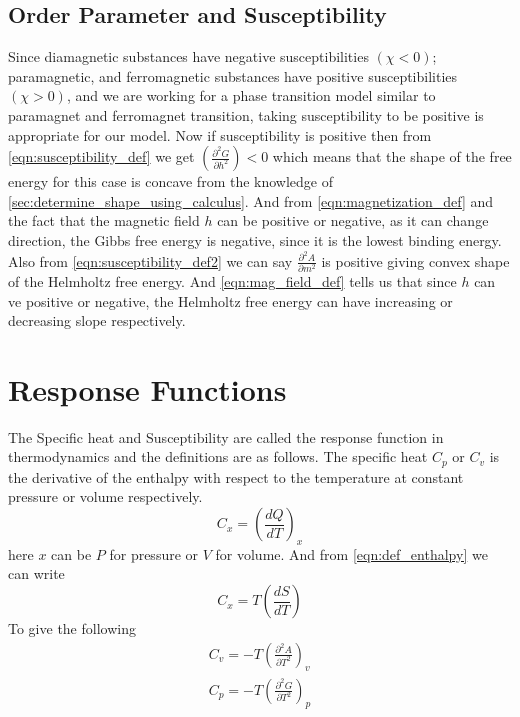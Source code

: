 	\subsection{Order Parameter and Susceptibility}
	Since diamagnetic substances have negative susceptibilities $(\chi < 0)$; paramagnetic, and ferromagnetic substances have positive susceptibilities $(\chi > 0)$, and we are working for a phase transition model similar to paramagnet and ferromagnet transition, taking susceptibility to be positive is appropriate for our model. Now if susceptibility is positive then from \ref{eqn:susceptibility_def} we get $\left(\frac{\partial^2G}{\partial h ^2}\right) < 0$ which means that the shape of the free energy for this case is concave from the knowledge of \ref{sec:determine_shape_using_calculus}. And from \ref{eqn:magnetization_def} and the fact that the magnetic field $h$ can be positive or negative, as it can change direction, the Gibbs free energy is negative, since it is the lowest binding energy. \\
	Also from \ref{eqn:susceptibility_def2} we can say $\frac{\partial^2 A}{\partial m ^2}$ is positive giving convex shape of the Helmholtz free energy. And \ref{eqn:mag_field_def} tells us that since $h$ can ve positive or negative, the Helmholtz free energy can have increasing or decreasing slope respectively.
	


\section{Response Functions}
	\label{sect:response-functions}
	The Specific heat and Susceptibility are called the response function in thermodynamics and the definitions are as follows. The specific heat $C_p$ or $C_v$ is the derivative of the enthalpy with respect to the temperature at constant pressure or volume respectively.
	\begin{equation}
	C_x = \left(\frac{dQ}{dT}\right)_x
	\label{eqn:def_specific_heat}
	\end{equation}
	here $x$ can be $P$ for pressure or $V$ for volume. And from \ref{eqn:def_enthalpy} we can write
	\begin{equation}
	C_x = T \left(\frac{dS}{dT}\right)
	\label{eqn:def2_specific_heat_by_entropy} 
	\end{equation}
	To give the following
	\begin{align}
	C_v = -T\left(\frac{\partial^2 A}{\partial T^2}\right)_v \\
	C_p = -T\left(\frac{\partial^2 G}{\partial T^2}\right)_p
	\label{eqn:def2_specific_heat} 
	\end{align}
	
